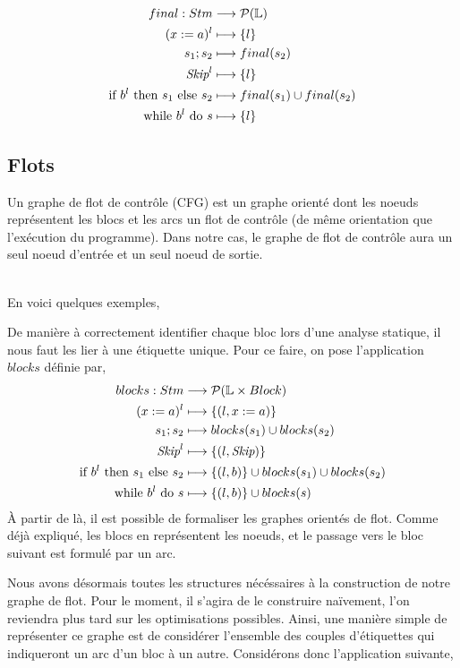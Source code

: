 \documentclass[a4paper, 11pt]{article}
\begin{document}
\begin{align*}
	final : Stm &\longrightarrow \mathcal{P}(\mathbb{L})\\
	({x}\space:=\space{a})^l &\longmapsto \{l\}\\
	{s_1}\space;\space{s_2} &\longmapsto final(s_2)\\
	\textit{Skip}^l &\longmapsto \{l\}\\
	\text{if }{b^l}\text{ then }{s_1}\text{ else }{s_2} &\longmapsto final(s_1) \cup final(s_2)\\
	\text{while }{b^l}\text{ do }{s} &\longmapsto \{l\}
\end{align*}

\subsection{Flots}
\begin{definition}
	Un graphe de flot de contrôle (CFG) est un graphe orienté dont les noeuds représentent les blocs et les arcs un
	flot de contrôle (de même orientation que l'exécution du programme). Dans notre cas, le graphe de flot de
	contrôle aura un seul noeud d'entrée et un seul noeud de sortie.
\end{definition}
\\
En voici quelques exemples,
\begin{center}\end{center}

De manière à correctement identifier chaque bloc lors d'une analyse statique, il nous faut les lier à une étiquette
unique. Pour ce faire, 
on pose l'application $blocks$ définie par,
\begin{align*}
	blocks : Stm &\longrightarrow \mathcal{P}(\mathbb{L} \times Block)\\
	({x}\space:=\space{a})^l&\longmapsto\{(l, x := a)\}\\
	{s_1}\space;\space{s_2} &\longmapsto blocks(s_1) \cup blocks(s_2)\\
	\textit{Skip}^l &\longmapsto \{(l, \textit{Skip})\}\\
	\text{if }{b^l}\text{ then }{s_1}\text{ else }{s_2} &\longmapsto \{(l, b)\}\cup blocks(s_1)\cup blocks(s_2)\\
	\text{while }{b^l}\text{ do }{s} &\longmapsto \{(l, b)\}\cup blocks(s)
\end{align*}
À partir de là, il est possible de formaliser les graphes orientés de flot. Comme déjà expliqué, les blocs en représentent les noeuds, 
et le passage vers le bloc suivant est formulé par un arc.

Nous avons désormais toutes les structures nécéssaires à la construction de notre graphe de flot. Pour le moment, il s'agira de 
le construire naïvement, l'on reviendra plus tard sur les optimisations possibles. Ainsi, une manière simple de représenter ce 
graphe est de considérer l'ensemble des couples d'étiquettes qui indiqueront un arc d'un bloc à un autre. 
Considérons donc l'application suivante, 
\end{document}
